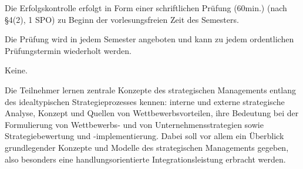 \begin{course}

\setdoclanguagegerman
{}



\coursehead


\label{cour_5015.dp_997}


\begin{styleenv}
\begin{assessment}
Die Erfolgskontrolle erfolgt in Form einer schriftlichen Prüfung (60min.) (nach §4(2), 1 SPO) zu Beginn der vorlesungsfreien Zeit des Semesters.

 

Die Prüfung wird in jedem Semester angeboten und kann zu jedem ordentlichen Prüfungstermin wiederholt werden.


\end{assessment}

\begin{conditions}Keine.\end{conditions}


\end{styleenv}

\begin{learningoutcomes}
Die Teilnehmer lernen zentrale Konzepte des strategischen Managements entlang des idealtypischen Strategieprozesses kennen: interne und externe strategische Analyse, Konzept und Quellen von Wettbewerbsvorteilen, ihre Bedeutung bei der Formulierung von Wettbewerbs- und von Unternehmensstrategien sowie Strategiebewertung und -implementierung. Dabei soll vor allem ein Überblick grundlegender Konzepte und Modelle des strategischen Managements gegeben, also besonders eine handlungsorientierte Integrationsleistung erbracht werden.


\end{learningoutcomes}


\end{course}
